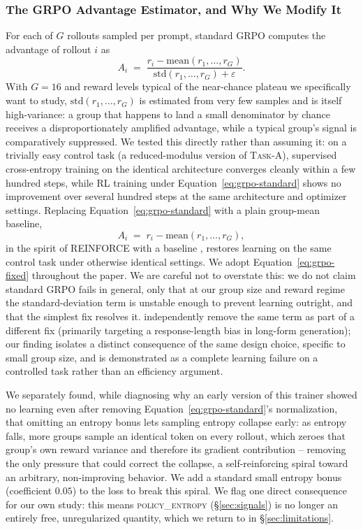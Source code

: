 \documentclass{article}
\newcommand{\taskA}{\textsc{Task-A}}
\newcommand{\pentropy}{\textsc{policy\_entropy}}
\begin{document}
\subsubsection{The GRPO Advantage Estimator, and Why We Modify It}
\label{sec:grpo-fix}

For each of $G$ rollouts sampled per prompt, standard GRPO
\citep{shao2024deepseekmath} computes the advantage of rollout $i$ as
\begin{equation}
A_i \;=\; \frac{r_i - \mathrm{mean}(r_1,\dots,r_G)}{\mathrm{std}(r_1,\dots,r_G) + \varepsilon}.
\label{eq:grpo-standard}
\end{equation}
With $G{=}16$ and reward levels typical of the near-chance plateau we
specifically want to study, $\mathrm{std}(r_1,\dots,r_G)$ is estimated from
very few samples and is itself high-variance: a group that happens to land a
small denominator by chance receives a disproportionately amplified advantage,
while a typical group's signal is comparatively suppressed. We tested this
directly rather than assuming it: on a trivially easy control task (a
reduced-modulus version of \taskA), supervised cross-entropy training on the
identical architecture converges cleanly within a few hundred steps, while RL
training under Equation~\ref{eq:grpo-standard} shows no improvement over
several hundred steps at the same architecture and optimizer settings.
Replacing Equation~\ref{eq:grpo-standard} with a plain group-mean baseline,
\begin{equation}
A_i \;=\; r_i - \mathrm{mean}(r_1,\dots,r_G),
\label{eq:grpo-fixed}
\end{equation}
in the spirit of REINFORCE with a baseline \citep{williams1992reinforce},
restores learning on the same control task under otherwise identical settings.
We adopt Equation~\ref{eq:grpo-fixed} throughout the paper. We are careful not
to overstate this: we do not claim standard GRPO fails in general, only that at
our group size and reward regime the standard-deviation term is unstable
enough to prevent learning outright, and that the simplest fix resolves it.
\citet{liu2025understanding} independently remove the same term as part of a
different fix (primarily targeting a response-length bias in long-form
generation); our finding isolates a distinct consequence of the same design
choice, specific to small group size, and is demonstrated as a complete
learning failure on a controlled task rather than an efficiency argument.

We separately found, while diagnosing why an early version of this trainer
showed no learning even after removing Equation~\ref{eq:grpo-standard}'s
normalization, that omitting an entropy bonus lets sampling entropy collapse
early: as entropy falls, more groups sample an identical token on every
rollout, which zeroes that group's own reward variance and therefore its
gradient contribution -- removing the only pressure that could correct the
collapse, a self-reinforcing spiral toward an arbitrary, non-improving
behavior. We add a standard small entropy bonus (coefficient $0.05$) to the
loss to break this spiral. We flag one direct consequence for our own study:
this means \pentropy{} (\S\ref{sec:signals}) is no longer an entirely free,
unregularized quantity, which we return to in \S\ref{sec:limitations}.
\end{document}
